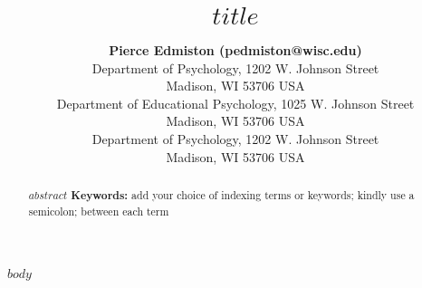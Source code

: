 \documentclass[10pt,letterpaper]{article}
\title{$title$}
\author{{\large \bf Pierce Edmiston (pedmiston@wisc.edu)} \\
  Department of Psychology, 1202 W. Johnson Street \\
  Madison, WI 53706 USA
  \AND {\large \bf Marcus Perlman} \\
  Department of Educational Psychology, 1025 W. Johnson Street \\
  Madison, WI 53706 USA
  \AND {\large \bf Gary Lupyan} \\
  Department of Psychology, 1202 W. Johnson Street \\
  Madison, WI 53706 USA}
\begin{document}
\maketitle

\begin{abstract}
$abstract$
\textbf{Keywords:}
add your choice of indexing terms or keywords; kindly use a
semicolon; between each term
\end{abstract}

$body$



\end{document}
